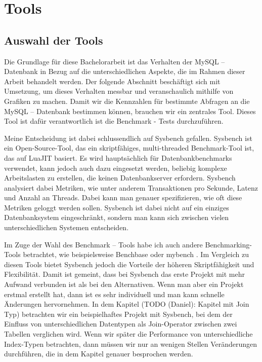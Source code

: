 \chapter{Tools}\label{sec:tools}

\section{Auswahl der Tools}\label{sec:auswahl-der-tools}

Die Grundlage für diese Bachelorarbeit ist das Verhalten der MySQL – Datenbank \cite{sysbench_mysql} in Bezug auf die unterschiedlichen Aspekte, die im Rahmen dieser Arbeit behandelt werden.
Der folgende Abschnitt beschäftigt sich mit Umsetzung, um dieses Verhalten messbar und veranschaulich mithilfe von Grafiken zu machen.
Damit wir die Kennzahlen für bestimmte Abfragen an die MySQL – Datenbank bestimmen können, brauchen wir ein zentrales Tool.
Dieses Tool ist dafür verantwortlich ist die Benchmark - Tests durchzuführen.

Meine Entscheidung ist dabei schlussendlich auf Sysbench \cite{sysbench_repo} gefallen.
Sysbench ist ein Open-Source-Tool, das ein skriptfähiges, multi-threaded Benchmark-Tool ist, das auf LuaJIT basiert.
Es wird hauptsächlich für Datenbankbenchmarks verwendet, kann jedoch auch dazu eingesetzt werden, beliebig komplexe Arbeitslasten zu erstellen, die keinen Datenbankserver erfordern.
Sysbench analysiert dabei Metriken, wie unter anderem Transaktionen pro Sekunde, Latenz und Anzahl an Threads.
Dabei kann man genauer spezifizieren, wie oft diese Metriken geloggt werden sollen.
Sysbench ist dabei nicht auf ein einziges Datenbanksystem eingeschränkt, sondern man kann sich zwischen vielen unterschiedlichen Systemen entscheiden.

Im Zuge der Wahl des Benchmark – Tools habe ich auch andere Benchmarking-Tools betrachtet, wie beispielsweise Benchbase \cite{DifallahPCC13} oder mybench \cite{mybench_repo}.
Im Vergleich zu diesen Tools bietet Sysbench jedoch die Vorteile der höheren Skriptfähigkeit und Flexibilität.
Damit ist gemeint, dass bei Sysbench das erste Projekt mit mehr Aufwand verbunden ist als bei den Alternativen.
Wenn man aber ein Projekt erstmal erstellt hat, dann ist es sehr individuell und man kann schnelle Änderungen hervornehmen.
In dem Kapitel (TODO (Daniel): Kapitel mit Join Typ) betrachten wir ein beispielhaftes Projekt mit Sysbench, bei dem der Einfluss von unterschiedlichen Datentypen als Join-Operator zwischen zwei Tabellen verglichen wird.
Wenn wir später die Performance von unterschiedliche Index-Typen betrachten, dann müssen wir nur an wenigen Stellen Veränderungen durchführen, die in dem Kapitel genauer besprochen werden.

